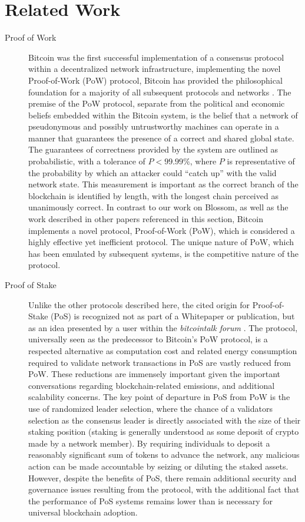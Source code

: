 \section{Related Work}\label{related}

\begin{description}
\item[Proof of Work] Bitcoin was the first successful implementation of a consensus protocol within a decentralized network infrastructure, implementing the novel Proof-of-Work (PoW) protocol, Bitcoin has provided the philosophical foundation for a majority of all subsequent protocols and networks \cite{Nakamoto2008}. The premise of the PoW protocol, separate from the political and economic beliefs embedded within the Bitcoin system, is the belief that a network of pseudonymous and possibly untrustworthy machines can operate in a manner that guarantees the presence of a correct and shared global state. The guarantees of correctness provided by the system are outlined as probabilistic, with a tolerance of \(P<99.99\%\), where $P$ is representative of the probability by which an attacker could “catch up” with the valid network state. This measurement is important as the correct branch of the blockchain is identified by length, with the longest chain perceived as unanimously correct. In contrast to our work on Blossom, as well as the work described in other papers referenced in this section, Bitcoin implements a novel protocol, Proof-of-Work (PoW), which is considered a highly effective yet inefficient protocol. The unique nature of PoW, which has been emulated by subsequent systems, is the competitive nature of the protocol.
\item[Proof of Stake] Unlike the other protocols described here, the cited origin for Proof-of-Stake (PoS) is recognized not as part of a Whitepaper or publication, but as an idea presented by a user within the \textit{bitcointalk forum} \cite{POS}. The protocol, universally seen as the predecessor to Bitcoin’s PoW protocol, is a respected alternative as computation cost and related energy consumption required to validate network transactions in PoS are vastly reduced from PoW. These reductions are immensely important given the important conversations regarding blockchain-related emissions, and additional scalability concerns. The key point of departure in PoS from PoW is the use of randomized leader selection, where the chance of a validators selection as the consensus leader is directly associated with the size of their staking position (staking is generally understood as some deposit of crypto made by a network member). By requiring individuals to deposit a reasonably significant sum of tokens to advance the network, any malicious action can be made accountable by seizing or diluting the staked assets. However, despite the benefits of PoS, there remain additional security and governance issues resulting from the protocol, with the additional fact that the performance of PoS systems remains lower than is necessary for universal blockchain adoption.

\end{description}
